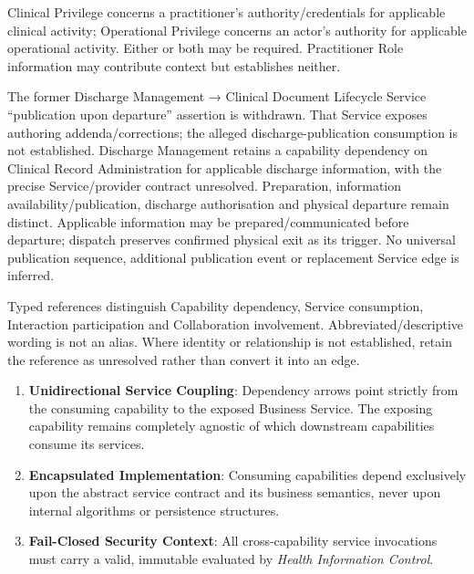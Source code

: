 \label{rad:dependencies:81}

Clinical Privilege concerns a practitioner's authority/\allowbreak{}credentials for applicable clinical activity; Operational Privilege concerns an actor's authority for applicable operational activity. Either or both may be required. Practitioner Role information may contribute context but establishes neither.

\label{rad:dependencies:83}

The former Discharge Management → Clinical Document Lifecycle Service “publication upon departure” assertion is withdrawn. That Service exposes authoring addenda/\allowbreak{}corrections; the alleged discharge-publication consumption is not established. Discharge Management retains a capability dependency on Clinical Record Administration for applicable discharge information, with the precise Service/\allowbreak{}provider contract unresolved. Preparation, information availability/\allowbreak{}publication, discharge authorisation and physical departure remain distinct. Applicable information may be prepared/\allowbreak{}communicated before departure; \texttt{} dispatch preserves confirmed physical exit as its trigger. No universal publication sequence, additional publication event or replacement Service edge is inferred.

\label{rad:dependencies:85}

Typed references distinguish Capability dependency, Service consumption, Interaction participation and Collaboration involvement. Abbreviated/\allowbreak{}descriptive wording is not an alias. Where identity or relationship is not established, retain the reference as unresolved rather than convert it into an edge.

\label{rad:dependencies:87}

\begin{enumerate}

\item
\textbf{Unidirectional Service Coupling}: Dependency arrows point strictly from the consuming capability to the exposed Business Service. The exposing capability remains completely agnostic of which downstream capabilities consume its services.



\item
\textbf{Encapsulated Implementation}: Consuming capabilities depend exclusively upon the abstract service contract and its business semantics, never upon internal algorithms or persistence structures.



\item
\textbf{Fail-Closed Security Context}: All cross-capability service invocations must carry a valid, immutable \texttt{} evaluated by \emph{Health Information Control}.



\end{enumerate}
\label{rad:dependencies:91}

